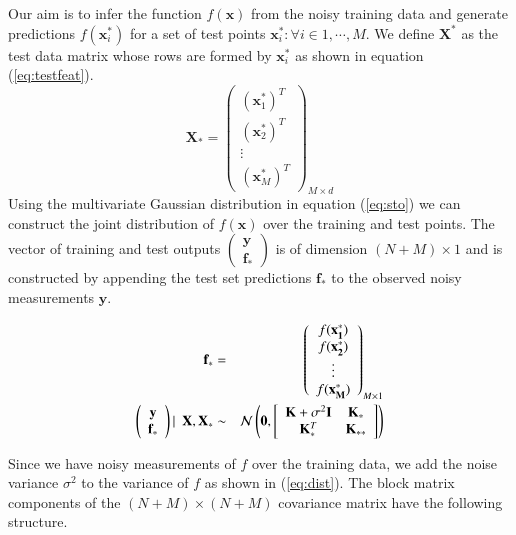 \documentclass[referee,a4paper,12pt,traditabstract]{swsc}
\begin{document}
\begin{linenumbers}
Our aim is to infer the function $f(\mathbf{x})$ from the noisy training data and generate predictions $f(\mathbf{x}^{*}_i)$ for a set of test points $ {\mathbf{x}^{*}_i : \forall i \in 1, \cdots, M} $. We define $\mathbf{X}^*$ as the test data matrix whose rows are formed by $\mathbf{x}^{*}_i$ as shown in equation (\ref{eq:testfeat}). 
\begin{equation}
    \mathbf{X}_* = \left( \begin{array}{c} (\mathbf{x}^{*}_1)^T \\ (\mathbf{x}^{*}_2)^T \\ \vdots \\ (\mathbf{x}^{*}_M)^T \end{array} \right)_{M \times d} \label{eq:testfeat} 
\end{equation}
Using the multivariate Gaussian distribution in equation (\ref{eq:sto}) we can construct the joint distribution of $f(\mathbf{x})$ over the training and test points. The vector of training and test outputs $\left( \begin{array}{c} \mathbf{y} \\ \mathbf{f_*} \end{array} \right)$ is of dimension $(N+M) \times 1$ and is constructed by appending the test set predictions $\mathbf{f}_*$ to the observed noisy measurements $\mathbf{y}$.

\begin{eqnarray}
    \mathbf{f}_* & = & \left( \begin{array}{c} f(\mathbf{x^{*}_1}) \\ f(\mathbf{x^{*}_2}) \\ \vdots \\ f(\mathbf{x^{*}_M}) \end{array} \right)_{M \times 1} \\
     \vspace{4\baselineskip}
    \left( \begin{array}{c} \mathbf{y} \\ \mathbf{f_*} \end{array} \right) | \ \ \mathbf{X}, \mathbf{X}_* & \sim & 
    \mathcal{N}\left(\mathbf{0}, \left[ \begin{array}{cc} \mathbf{K} + \sigma^{2} \mathbf{I} & \mathbf{K}_{*} \\ \mathbf{K}_{*}^T & \mathbf{K}_{**} \end{array} \right ] \right) \label{eq:dist}
\end{eqnarray}

Since we have noisy measurements of $f$ over the training data, we add the noise variance $\sigma^2$ to the variance of $f$ as shown in (\ref{eq:dist}). The block matrix components of the $(N+M) \times (N+M)$ covariance matrix have the following structure.


\end{linenumbers}
\end{document}
